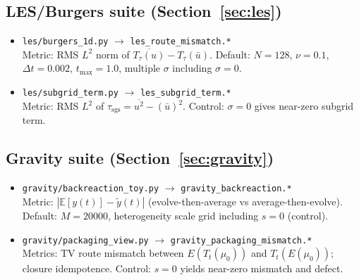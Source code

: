 \documentclass[11pt]{article}
\begin{document}
\subsection*{LES/Burgers suite (Section~\ref{sec:les})}
\begin{itemize}
  \item {\small\texttt{les/burgers\_1d.py}} $\to$ {\small\texttt{les\_route\_mismatch.*}}\\
  Metric: RMS $L^2$ norm of $\overline{T_\tau(u)} - T_\tau(\bar{u})$.
  Default: $N=128$, $\nu=0.1$, $\Delta t=0.002$, $t_{\max}=1.0$, multiple $\sigma$ including $\sigma=0$.

  \item {\small\texttt{les/subgrid\_term.py}} $\to$ {\small\texttt{les\_subgrid\_term.*}}\\
  Metric: RMS $L^2$ of $\tau_{\mathrm{sgs}}=\overline{u^2}-(\bar{u})^2$.
  Control: $\sigma=0$ gives near-zero subgrid term.
\end{itemize}

\subsection*{Gravity suite (Section~\ref{sec:gravity})}
\begin{itemize}
  \item {\small\texttt{gravity/backreaction\_toy.py}} $\to$ {\small\texttt{gravity\_backreaction.*}}\\
  Metric: $|\mathbb{E}[y(t)] - \tilde{y}(t)|$ (evolve-then-average vs average-then-evolve).
  Default: $M=20000$, heterogeneity scale grid including $s=0$ (control).

  \item {\small\texttt{gravity/packaging\_view.py}} $\to$ {\small\texttt{gravity\_packaging\_mismatch.*}}\\
  Metrics: TV route mismatch between $E(T_t(\mu_0))$ and $T_t(E(\mu_0))$; closure idempotence.
  Control: $s=0$ yields near-zero mismatch and defect.
\end{itemize}
 
\end{document}

